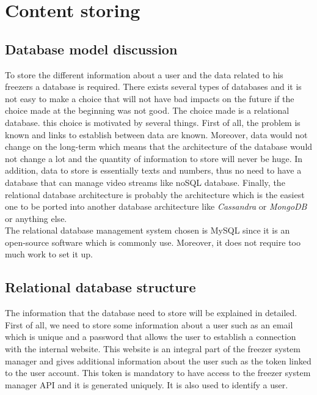 
\section{Content storing}
\subsection{Database model discussion}
To store the different information about a user and the data related to his freezers a database is required. There exists several types of databases and it is not easy to make a choice that will not have bad impacts on the future if the choice made at the beginning was not good. The choice made is a relational database. this choice is motivated by several things. First of all, the problem is known and links to establish between data are known. Moreover, data would not change on the long-term which means that the architecture of the database would not change a lot and the quantity of information to store will never be huge. In addition, data to store is essentially texts and numbers, thus no need to have a database that can manage video streams like noSQL database. Finally,
the relational database architecture is probably the architecture which is the easiest one to be ported into another database architecture like \textit{Cassandra} or \textit{MongoDB} or anything else.\\

The relational database management system chosen is MySQL since it is an open-source software which is commonly use. Moreover, it does not require too much work to set it up.

\subsection{Relational database structure}
The information that the database need to store will be explained in detailed.\\

First of all, we need to store some information about a user such as an email which is unique and a password that allows the user to establish a connection with the internal website. This website is an integral part of the freezer system manager and gives additional information about the user such as the token linked to the user account. This token is mandatory to have access to the freezer system manager API and it is generated uniquely. It is also used to identify a user. \\

